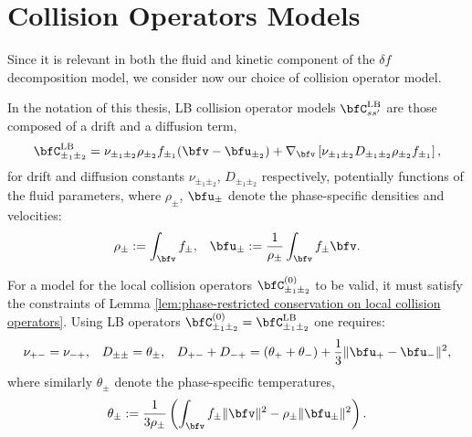 \section{Collision Operators Models}\label{cha:collision operators}
    Since it is relevant in both the fluid and kinetic component of the $\delta\!f$ decomposition model, we consider now our choice of collision operator model.

    \line

    \begin{definition}\label{def:LB collision operators}
        In the notation of this thesis, LB collision operator models $\bfC_{ss'}^{\rm LB}$ are those composed of a drift and a diffusion term,
        \begin{equation}\label{eqn:LB operator}
            \bfC_{\pm_{1}\pm_{2}}^{\rm LB}  =  \nu_{\pm_{1}\pm_{2}}\rho_{\pm_{2}}f_{\pm_{1}}(\bfv - \bfu_{\pm_{2}}) + \nabla_{\bfv}\left[\nu_{\pm_{1}\pm_{2}}D_{\pm_{1}\pm_{2}}\rho_{\pm_{2}}f_{\pm_{1}}\right],
        \end{equation}
        for drift and diffusion constants $\nu_{\pm_{1}\pm_{2}}$, $D_{\pm_{1}\pm_{2}}$ respectively, potentially functions of the fluid parameters, where $\rho_{\pm}$, $\bfu_{\pm}$ denote the phase-specific densities and velocities:
        \begin{align}
            \rho_{\pm}  :=                      \int_{\bfv}f_{\pm},  &&
            \bfu_{\pm}  :=  \frac{1}{\rho_{\pm}}\int_{\bfv}f_{\pm}\bfv.
        \end{align}
    \end{definition}

    \line

    For a model for the local collision operators $\bfC_{\pm_{1}\pm_{2}}^{(0)}$ to be valid, it must satisfy the constraints of Lemma \ref{lem:phase-restricted conservation on local collision operators}. Using LB operators $\bfC_{\pm_{1}\pm_{2}}^{(0)}  =  \bfC_{\pm_{1}\pm_{2}}^{\rm LB}$ one requires:
    \begin{align}
               \nu_{+-}  =  \nu_{-+},  &&
             D_{\pm\pm}  =  \theta_{\pm},  &&
        D_{+-} + D_{-+}  =  (\theta_{+} + \theta_{-}) + \frac{1}{3}\|\bfu_{+} - \bfu_{-}\|^{2},
    \end{align}
    where similarly $\theta_{\pm}$ denote the phase-specific temperatures,
    \begin{equation}
        \theta_{\pm}  :=  \frac{1}{3\rho_{\pm}}\left(\int_{\bfv}f_{\pm}\|\bfv\|^{2} - \rho_{\pm}\|\bfu_{\pm}\|^{2}\right).
    \end{equation}

